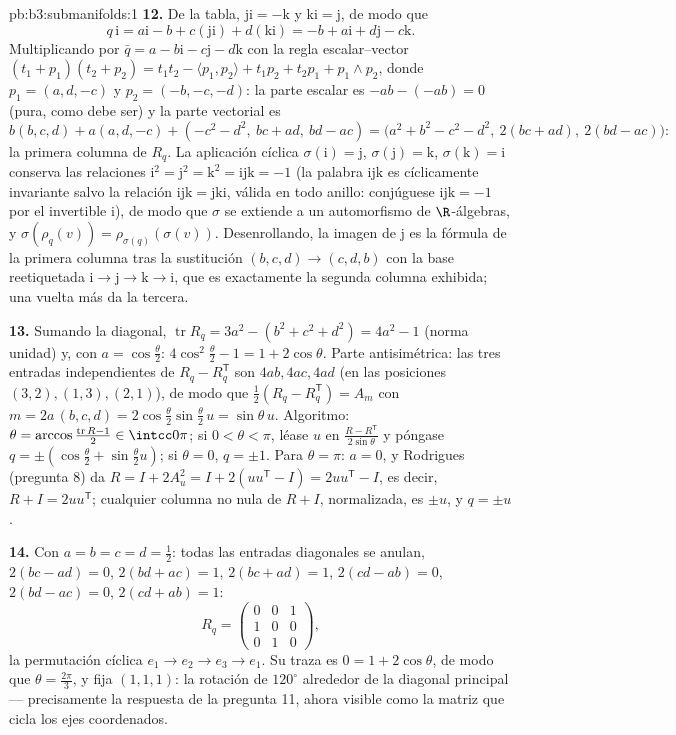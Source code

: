 \begin{solution}{pb:b3:submanifolds:1}
\textbf{12.} De la tabla, $\mathrm{ji} = -\mathrm k$ y
$\mathrm{ki} = \mathrm j$, de modo que
\[
q\,\mathrm i = a\mathrm i - b + c(\mathrm{ji}) +
d(\mathrm{ki}) = -b + a\mathrm i + d\mathrm j - c\mathrm k .
\]
Multiplicando por $\bar q = a - b\mathrm i - c\mathrm j -
d\mathrm k$ con la regla escalar--vector $(t_1 + p_1)(t_2 +
p_2) = t_1t_2 - \langle p_1, p_2\rangle + t_1p_2 + t_2p_1 +
p_1\wedge p_2$, donde $p_1 = (a, d, -c)$ y $p_2 = (-b, -c,
-d)$: la parte escalar es $-ab - (-ab) = 0$ (pura, como debe ser) y la
parte vectorial es
\[
b(b, c, d) + a(a, d, -c) + (-c^2 - d^2,\ bc + ad,\ bd - ac)
= \bigl(a^2 + b^2 - c^2 - d^2,\ 2(bc + ad),\ 2(bd -
ac)\bigr):
\]
la primera columna de $R_q$. La aplicación cíclica $\sigma(\mathrm i)
= \mathrm j$, $\sigma(\mathrm j) = \mathrm k$,
$\sigma(\mathrm k) = \mathrm i$ conserva las relaciones
$\mathrm i^2 = \mathrm j^2 = \mathrm k^2 = \mathrm{ijk} =
-1$ (la palabra $\mathrm{ijk}$ es cíclicamente invariante salvo la
relación $\mathrm{ijk} = \mathrm{jki}$, válida en todo anillo:
conjúguese $\mathrm{ijk} = -1$ por el invertible $\mathrm i$), de modo
que $\sigma$ se extiende a un automorfismo de $\R$-álgebras, y
$\sigma(\rho_q(v)) =
\rho_{\sigma(q)}(\sigma(v))$. Desenrollando, la imagen de $\mathrm j$ es
la fórmula de la primera columna tras la sustitución
$(b, c, d) \to (c, d, b)$ con la base reetiquetada
$\mathrm i \to \mathrm j \to \mathrm k \to \mathrm
i$, que es exactamente la segunda columna exhibida; una vuelta más da la
tercera.

\textbf{13.} Sumando la diagonal, $\operatorname{tr}R_q =
3a^2 - (b^2 + c^2 + d^2) = 4a^2 - 1$ (norma unidad) y, con
$a = \cos\frac\theta2$: $4\cos^2\frac\theta2 - 1 = 1 +
2\cos\theta$. Parte antisimétrica: las tres entradas independientes de
$R_q - R_q^{\mathsf T}$ son $4ab, 4ac, 4ad$ (en las posiciones
$(3,2), (1,3), (2,1)$), de modo que $\frac12(R_q -
R_q^{\mathsf T}) = A_m$ con $m = 2a\,(b, c, d) =
2\cos\frac\theta2\sin\frac\theta2\,u = \sin\theta\,u$. Algoritmo:
$\theta = \arccos\frac{\operatorname{tr}R -
1}{2} \in \intcc0\pi$; si $0 < \theta < \pi$, léase $u$ en
$\frac{R - R^{\mathsf T}}{2\sin\theta}$ y póngase $q =
\pm(\cos\frac\theta2 + \sin\frac\theta2 u)$; si $\theta =
0$, $q = \pm1$. Para $\theta = \pi$: $a = 0$, y Rodrigues (pregunta 8)
da $R = I + 2A_u^2 = I + 2(uu^{\mathsf T} -
I) = 2uu^{\mathsf T} - I$, es decir, $R + I = 2uu^{\mathsf T}$;
cualquier columna no nula de $R + I$, normalizada, es $\pm u$, y
$q = \pm u$.

\textbf{14.} Con $a = b = c = d = \frac12$: todas las entradas
diagonales se anulan, $2(bc - ad) = 0$, $2(bd + ac) = 1$, $2(bc +
ad) = 1$, $2(cd - ab) = 0$, $2(bd - ac) = 0$, $2(cd + ab) =
1$:
\[
R_q = \begin{pmatrix} 0 & 0 & 1\\ 1 & 0 & 0\\ 0 & 1 & 0
\end{pmatrix},
\]
la permutación cíclica $e_1 \to e_2 \to e_3 \to e_1$. Su traza es
$0 = 1 + 2\cos\theta$, de modo que $\theta = \frac{2\pi}3$, y fija
$(1,1,1)$: la rotación de $120^\circ$ alrededor de la diagonal principal
--- precisamente la respuesta de la pregunta 11, ahora visible como la
matriz que cicla los ejes coordenados.


\end{solution}
